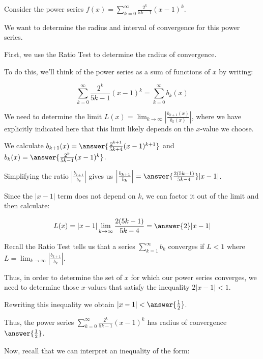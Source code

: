 \documentclass{ximera}
\author{Jim Talamo}
\begin{document}
\begin{exercise}
Consider the power series $f(x) = \sum_{k=0}^{\infty} \frac{2^k}{5k-1}(x-1)^{k}$.

We want to determine the radius and interval of convergence for this power series. 

First, we use the Ratio Test to determine the radius of convergence. 

To do this, we'll think of the power series as a sum of functions of $x$ by writing: 

\[
\sum_{k=0}^{\infty} \frac{2^k}{5k-1}(x-1)^{k} = \sum_{k=0}^{\infty} b_k(x)
\]

We need to determine the limit $L(x) = \lim_{k \to \infty} \left| \frac{b_{k+1}(x)}{b_k(x)}\right|$, where we have explicitly indicated here that this limit likely depends on the $x$-value we choose. 

We calculate $b_{k+1}(x)=\answer{\frac{2^{k+1}}{5k+4}(x-1)^{k+1}}$ and $b_k(x)=\answer{\frac{2^k}{5k-1}(x-1)^k}$. 

\begin{exercise}

Simplifying the ratio $\left|\frac{b_{k+1}}{b_k}\right|$ gives us $\left|\frac{b_{k+1}}{b_k}\right|=\answer{\frac{2(5k-1)}{5k-4}} |x-1|$.


\begin{exercise}

Since the $|x-1|$ term does not depend on $k$, we can factor it out of the limit and then calculate:

\[
L(x) = |x-1| \lim_{k \to \infty}   \frac{2(5k-1)}{5k-4}  =\answer{2} |x-1|
\]

\begin{exercise}

Recall the Ratio Test tells us that a series $\sum^{\infty}_{k=1} b_k$ converges if $L <1$ where $L=\lim_{k \to \infty}\left| \frac{b_{k+1}}{b_k}\right|$. 

Thus, in order to determine the set of $x$ for which our power series converges, we need to determine those $x$-values that satisfy the inequality $2|x-1| <1$. 

Rewriting this inequality we obtain $|x-1|< \answer{\frac{1}{2}}$. 

Thus, the  power series $\sum_{k=0}^{\infty} \frac{2^k}{5k-1}(x-1)^{k}$ has radius of convergence $\answer{\frac{1}{2}}$.

\begin{exercise}

Now, recall that we can interpret an inequality of the form:


\end{exercise}
\end{exercise}
\end{exercise}
\end{exercise}
\end{exercise}
\end{document}
